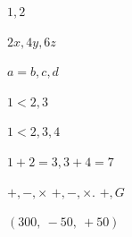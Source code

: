 \documentclass{article}
\begin{document}
$1,2$

$2x, 4y, 6z$

$a=b,c,d$

$1<2,3$

$1<2,3,4$

$1+2=3 , 3+4=7$

$+,-,\times$
$+,-,\times .$
$+,G$

$(300,\ -50,\ +50)$
\end{document}

